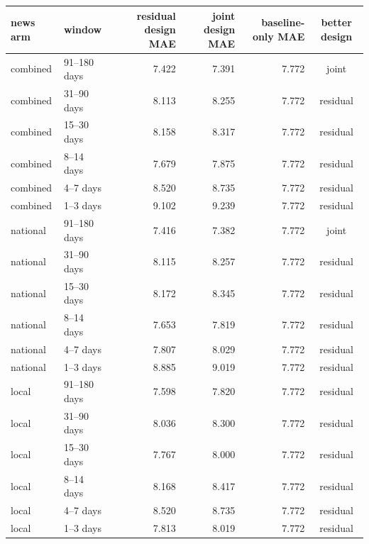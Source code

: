 \begin{tabular}{llrrrc}
\toprule
news arm & window & residual design MAE & joint design MAE & baseline-only MAE & better design \\
\midrule
combined & 91--180 days & 7.422 & 7.391 & 7.772 & joint \\
combined & 31--90 days & 8.113 & 8.255 & 7.772 & residual \\
combined & 15--30 days & 8.158 & 8.317 & 7.772 & residual \\
combined & 8--14 days & 7.679 & 7.875 & 7.772 & residual \\
combined & 4--7 days & 8.520 & 8.735 & 7.772 & residual \\
combined & 1--3 days & 9.102 & 9.239 & 7.772 & residual \\
national & 91--180 days & 7.416 & 7.382 & 7.772 & joint \\
national & 31--90 days & 8.115 & 8.257 & 7.772 & residual \\
national & 15--30 days & 8.172 & 8.345 & 7.772 & residual \\
national & 8--14 days & 7.653 & 7.819 & 7.772 & residual \\
national & 4--7 days & 7.807 & 8.029 & 7.772 & residual \\
national & 1--3 days & 8.885 & 9.019 & 7.772 & residual \\
local & 91--180 days & 7.598 & 7.820 & 7.772 & residual \\
local & 31--90 days & 8.036 & 8.300 & 7.772 & residual \\
local & 15--30 days & 7.767 & 8.000 & 7.772 & residual \\
local & 8--14 days & 8.168 & 8.417 & 7.772 & residual \\
local & 4--7 days & 8.520 & 8.735 & 7.772 & residual \\
local & 1--3 days & 7.813 & 8.019 & 7.772 & residual \\
\bottomrule
\end{tabular}
